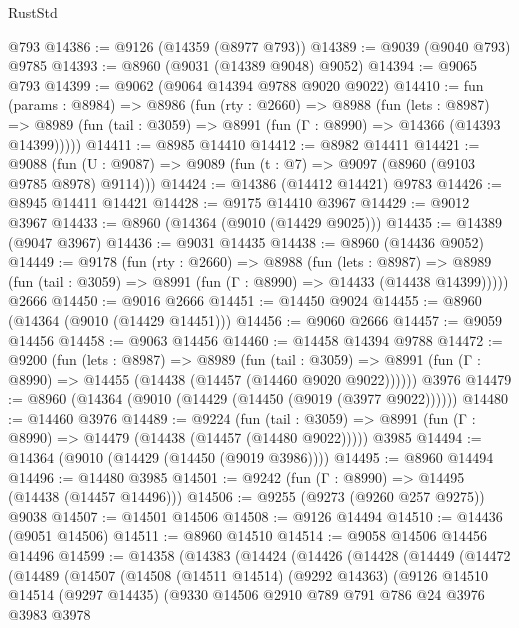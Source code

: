 \begin{lexlean}{RustStd}
\begin{coremodule}
    @793
@14386 := @9126 (@14359 (@8977 @793))
@14389 := @9039 (@9040 @793) @9785
@14393 := @8960 (@9031 (@14389 @9048) @9052)
@14394 := @9065 @793
@14399 := @9062 (@9064 @14394 @9788 @9020 @9022)
@14410 := fun (params : @8984) =>
  @8986
    (fun (rty : @2660) =>
    @8988
      (fun (lets : @8987) =>
      @8989 (fun (tail : @3059) => @8991 (fun (Γ : @8990) => @14366 (@14393 @14399)))))
@14411 := @8985 @14410
@14412 := @8982 @14411
@14421 := @9088 (fun (U : @9087) => @9089 (fun (t : @7) => @9097 (@8960 (@9103 @9785 @8978) @9114)))
@14424 := @14386 (@14412 @14421) @9783
@14426 := @8945 @14411 @14421
@14428 := @9175 @14410 @3967
@14429 := @9012 @3967
@14433 := @8960 (@14364 (@9010 (@14429 @9025)))
@14435 := @14389 (@9047 @3967)
@14436 := @9031 @14435
@14438 := @8960 (@14436 @9052)
@14449 := @9178
    (fun (rty : @2660) =>
    @8988
      (fun (lets : @8987) =>
      @8989 (fun (tail : @3059) => @8991 (fun (Γ : @8990) => @14433 (@14438 @14399)))))
    @2666
@14450 := @9016 @2666
@14451 := @14450 @9024
@14455 := @8960 (@14364 (@9010 (@14429 @14451)))
@14456 := @9060 @2666
@14457 := @9059 @14456
@14458 := @9063 @14456
@14460 := @14458 @14394 @9788
@14472 := @9200
    (fun (lets : @8987) =>
    @8989
      (fun (tail : @3059) =>
      @8991 (fun (Γ : @8990) => @14455 (@14438 (@14457 (@14460 @9020 @9022))))))
    @3976
@14479 := @8960 (@14364 (@9010 (@14429 (@14450 (@9019 (@3977 @9022))))))
@14480 := @14460 @3976
@14489 := @9224
    (fun (tail : @3059) => @8991 (fun (Γ : @8990) => @14479 (@14438 (@14457 (@14480 @9022)))))
    @3985
@14494 := @14364 (@9010 (@14429 (@14450 (@9019 @3986))))
@14495 := @8960 @14494
@14496 := @14480 @3985
@14501 := @9242 (fun (Γ : @8990) => @14495 (@14438 (@14457 @14496)))
@14506 := @9255 (@9273 (@9260 @257 @9275)) @9038
@14507 := @14501 @14506
@14508 := @9126 @14494
@14510 := @14436 (@9051 @14506)
@14511 := @8960 @14510
@14514 := @9058 @14506 @14456 @14496
@14599 := @14358
    (@14383
      (@14424
        (@14426
          (@14428
            (@14449
              (@14472
                (@14489
                  (@14507
                    (@14508
                      (@14511 @14514)
                      (@9292 @14363)
                      (@9126
                        @14510
                        @14514
                        (@9297 @14435)
                        (@9330
                          @14506
                          @2910
                          @789
                          @791
                          @786
                          @24
                          @3976
                          @3983
                          @3978

\end{coremodule}
\end{lexlean}
